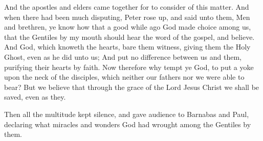  And the apostles and elders came together for to consider
of this matter.  And when there had been much disputing,
Peter rose up, and said unto them, Men and brethren, ye know how that a
good while ago God made choice among us, that the Gentiles by my mouth
should hear the word of the gospel, and believe.  And God,
which knoweth the hearts, bare them witness, giving them the Holy Ghost,
even as he did unto us;  And put no difference between us
and them, purifying their hearts by faith.  Now therefore
why tempt ye God, to put a yoke upon the neck of the disciples, which
neither our fathers nor we were able to bear?  But we
believe that through the grace of the Lord Jesus Christ we shall be
saved, even as they.

 Then all the multitude kept silence, and gave audience to
Barnabas and Paul, declaring what miracles and wonders God had wrought
among the Gentiles by them.

